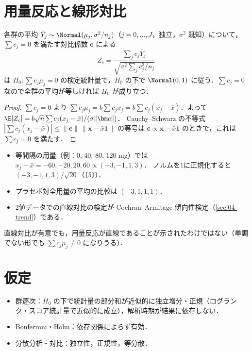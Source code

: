 \section{用量反応と線形対比}\label{sec:14-contrast}
各群の平均 $\bar Y_j\sim\Normal(\mu_j,\sigma^2/n_j)$（$j=0,\dots,J$，独立，$\sigma^2$ 既知）について，$\sum c_j=0$ を満たす対比係数 $\bm c$ による
\begin{equation}
Z_c=\frac{\sum_jc_j\bar Y_j}{\sqrt{\sigma^2\sum_jc_j^2/n_j}}\label{eq:14-contrast}
\end{equation}
は $H_0:\sum c_j\mu_j=0$ の検定統計量で，$H_0$ の下で $\Normal(0,1)$ に従う．$\sum c_j=0$ なので全群の平均が等しければ $H_0$ が成り立つ．
\begin{proof}
$\sum c_j=0$ より $\sum c_j\mu_j=b\sum c_jx_j=b\sum c_j(x_j-\bar x)$．よって $\E[Z_c]=b\sqrt n\sum c_j(x_j-\bar x)/(\sigma\|\bm c\|)$．
Cauchy--Schwarz の不等式 $|\sum c_j(x_j-\bar x)|\le\|\bm c\|\,\|\bm x-\bar x\bm1\|$ の等号は $\bm c\propto\bm x-\bar x\bm1$ のときで，これは $\sum c_j=0$ を満たす．
\end{proof}
\begin{itemize}
\item 等間隔の用量（例：0, 40, 80, 120 mg）では $x_j-\bar x=-60,-20,20,60\propto(-3,-1,1,3)$．
      ノルムを1に正規化すると $(-3,-1,1,3)/\sqrt{20}$（〔5〕）．
\item プラセボ対全用量の平均の比較は $(-3,1,1,1)$．
\item 2値データでの直線対比の検定が Cochran--Armitage 傾向性検定（\cref{sec:04-trend}）である．
\end{itemize}
\Youchui 直線対比が有意でも，用量反応が直線であることが示されたわけではない（単調でない形でも $\sum c_j\mu_j\ne0$ になりうる）．

\section{仮定}\label{sec:14-assump}
\begin{itemize}
\item 群逐次：$H_0$ の下で統計量の部分和が近似的に独立増分・正規（ログランク・スコア統計量で近似的に成立），解析時期が結果に依存しない．
\item Bonferroni・Holm：依存関係によらず有効．
\item 分散分析・対比：独立性，正規性，等分散．
\end{itemize}

